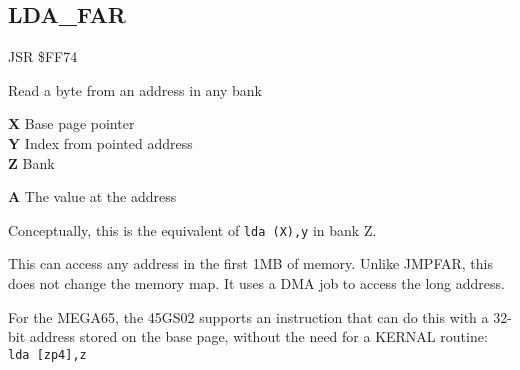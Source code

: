 \subsection{LDA{\_}FAR}
\label{KERNAL Jump Table!LDA_FAR}
\begin{description}[leftmargin=2cm,style=nextline]
    \item [Address:] JSR \$FF74
    \item [Description:] Read a byte from an address in any bank
    \item [Inputs:]
        \textbf{X} Base page pointer \\
        \textbf{Y} Index from pointed address \\
        \textbf{Z} Bank
    \item [Outputs:]
        \textbf{A} The value at the address
    \item [Remarks:]
        Conceptually, this is the equivalent of \texttt{lda (X),y} in bank Z.

        This can access any address in the first 1MB of memory. Unlike JMPFAR, this does not change the memory map. It uses a DMA job to access the long address.

        For the MEGA65, the 45GS02 supports an instruction that can do this with a 32-bit address stored on the base page, without the need for a KERNAL routine: \texttt{lda [zp4],z}
    \item [Example:]

\end{description}



\newpage
